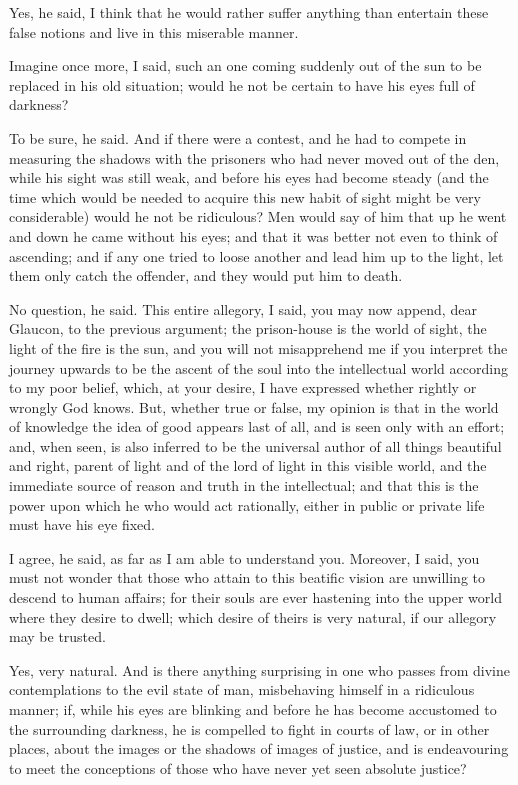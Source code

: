 Yes, he said, I think that he would rather suffer anything than entertain these false notions and live in this miserable manner.

Imagine once more, I said, such an one coming suddenly out of the sun to be replaced in his old situation; would he not be certain to have his eyes full of darkness?

To be sure, he said.
And if there were a contest, and he had to compete in measuring the shadows with the prisoners who had never moved out of the den, while his sight was still weak, and before his eyes had become steady (and the time which would be needed to acquire this new habit of sight might be very considerable) would he not be ridiculous? Men would say of him that up he went and down he came without his eyes; and that it was better not even to think of ascending; and if any one tried to loose another and lead him up to the light, let them only catch the offender, and they would put him to death.

No question, he said.
This entire allegory, I said, you may now append, dear Glaucon, to the previous argument; the prison-house is the world of sight, the light of the fire is the sun, and you will not misapprehend me if you interpret the journey upwards to be the ascent of the soul into the intellectual world according to my poor belief, which, at your desire, I have expressed whether rightly or wrongly God knows. But, whether true or false, my opinion is that in the world of knowledge the idea of good appears last of all, and is seen only with an effort; and, when seen, is also inferred to be the universal author of all things beautiful and right, parent of light and of the lord of light in this visible world, and the immediate source of reason and truth in the intellectual; and that this is the power upon which he who would act rationally, either in public or private life must have his eye fixed.

I agree, he said, as far as I am able to understand you.
Moreover, I said, you must not wonder that those who attain to this beatific vision are unwilling to descend to human affairs; for their souls are ever hastening into the upper world where they desire to dwell; which desire of theirs is very natural, if our allegory may be trusted.

Yes, very natural.
And is there anything surprising in one who passes from divine contemplations to the evil state of man, misbehaving himself in a ridiculous manner; if, while his eyes are blinking and before he has become accustomed to the surrounding darkness, he is compelled to fight in courts of law, or in other places, about the images or the shadows of images of justice, and is endeavouring to meet the conceptions of those who have never yet seen absolute justice?

